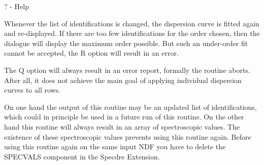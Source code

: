 {{{         \sstitem
         ? - Help

      }
      Whenever the list of identifications is changed, the dispersion
      curve is fitted again and re-displayed. If there are too few
      identifications for the order chosen, then the dialogue will
      display the maximum order possible. But such an under-order fit
      cannot be accepted, the R option will result in an error.

      The Q option will always result in an error report, formally the
      routine aborts. After all, it does not achieve the main goal of
      applying individual dispersion curves to all rows.

      On one hand the output of this routine may be an updated list of
      identifications, which could in principle be used in a future run
      of this routine. On the other hand this routine will always
      result in an array of spectroscopic values. The existence of
      these spectroscopic values prevents using this routine again.
      Before using this routine again on the same input NDF you have to
      delete the SPECVALS component in the Specdre Extension.

}}
